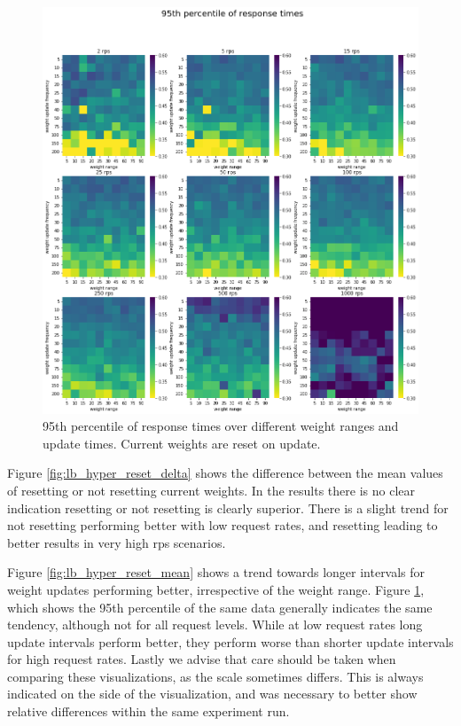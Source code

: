 \begin{figure}
    \centering
    \includegraphics[width=14cm]{graphics/graphs/lb_hyper_95th_percentile_with_reset.png}
    \caption{95th percentile of response times over different weight ranges and update times. Current weights are reset on update.}
    \label{fig:lb_hyper_reset_q95}
\end{figure}

Figure \ref{fig:lb_hyper_reset_delta} shows the difference between the mean values of resetting or not resetting current weights.
In the results there is no clear indication resetting or not resetting is clearly superior.
There is a slight trend for not resetting performing better with low request rates, and resetting leading to better results in very high \gls{rps} scenarios.

Figure \ref{fig:lb_hyper_reset_mean} shows a trend towards longer intervals for weight updates performing better, irrespective of the weight range.
Figure \ref{fig:lb_hyper_reset_q95}, which shows the 95th percentile of the same data generally indicates the same tendency, although not for all request levels.
While at low request rates long update intervals perform better, they perform worse than shorter update intervals for high request rates.
Lastly we advise that care should be taken when comparing these visualizations, as the scale sometimes differs.
This is always indicated on the side of the visualization, and was necessary to better show relative differences within the same experiment run.


